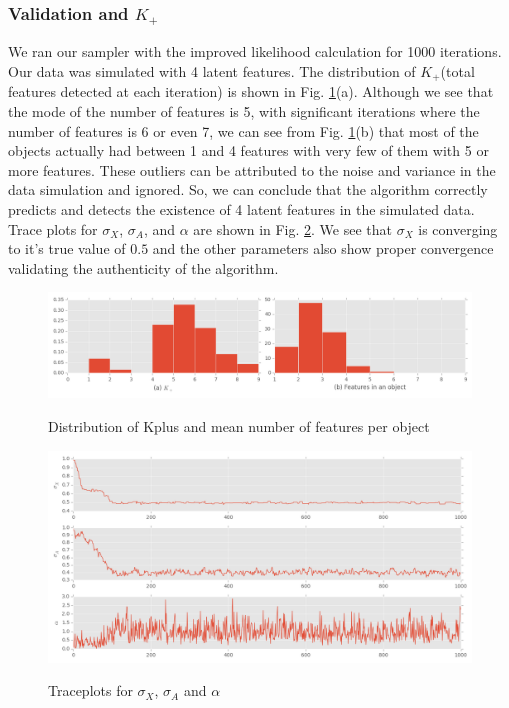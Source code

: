 \documentclass{article}
\begin{document}
\subsubsection{Validation and $K_+$}
We ran our sampler with the improved likelihood calculation for 1000 iterations. Our data was simulated with 4 latent features. The distribution of $K_+$(total features detected at each iteration) is shown in Fig. \ref{fig:dist}(a). Although we see that the mode of the number of features is 5, with significant iterations where the number of features is 6 or even 7, we can see from Fig. \ref{fig:dist}(b) that most of the objects actually had between 1 and 4 features with very few of them with 5 or more features. These outliers can be attributed to the noise and variance in the data simulation and ignored. So, we can conclude that the algorithm correctly predicts and detects the existence of 4 latent features in the simulated data.\\
Trace plots for $\sigma_X$, $\sigma_A$, and $\alpha$ are shown in Fig. \ref{fig:trace}. We see that $\sigma_X$ is converging to it's true value of $0.5$ and the other parameters also show proper convergence validating the authenticity of the algorithm.\\ 
\begin{figure}[ht]
\caption {Distribution of Kplus and mean number of features per object}
\includegraphics[width=\linewidth]{figures/kDistribution.png}
\label{fig:dist}
\end{figure}

\begin{figure}[ht]
\caption {Traceplots for $\sigma_X$, $\sigma_A$ and $\alpha$}
\includegraphics[width=\linewidth]{figures/Trace.png}
\label{fig:trace}
\end{figure}
\end{document}
